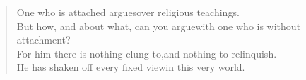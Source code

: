 \begin{verse}

 One who is attached argues\newline over religious teachings.\\
But how, and about what, can you argue\newline with one who is without attachment?\\
For him there is nothing clung to,\newline and nothing to relinquish.\\
He has shaken off every fixed view\newline in this very world.


\end{verse}

